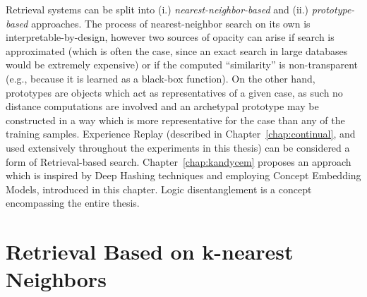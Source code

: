 Retrieval systems can be split into (i.) \textit{nearest-neighbor-based} and (ii.) \textit{prototype-based} approaches.
The process of nearest-neighbor search on its own is interpretable-by-design, however two sources of opacity can arise if search is approximated (which is often the case, since an exact search in large databases would be extremely expensive) or if the computed ``similarity'' is non-transparent  (e.g., because it is learned as a black-box function).
On the other hand, prototypes are objects which act as representatives of a given case, as such no distance computations are involved and an archetypal prototype may be constructed in a way which is more representative for the case than any of the training samples. %
%
Experience Replay (described in Chapter~\ref{chap:continual}, and used extensively throughout the experiments in this thesis) can be considered a form of Retrieval-based search. Chapter~\ref{chap:kandycem} proposes an approach which is inspired by Deep Hashing techniques and employing Concept Embedding Models, introduced in this chapter. Logic disentanglement is a concept encompassing the entire thesis.
\section{Retrieval Based on k-nearest Neighbors}

